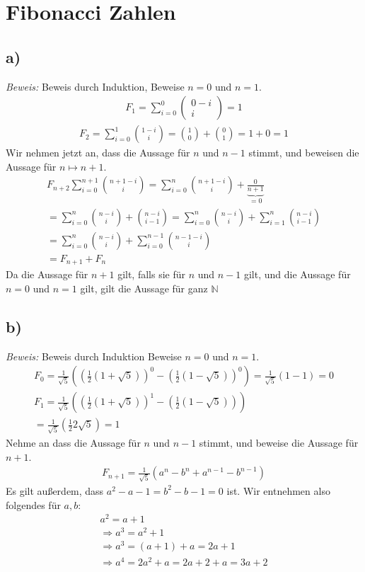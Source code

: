 \documentclass[]{scrartcl}
\begin{document}
\section{Fibonacci Zahlen}
\subsection{a)}
\textit{Beweis: } Beweis durch Induktion, Beweise $n = 0$ und $n=1$.
\begin{gather}
	F_1 = \sum_{i=0}^ 0
	\begin{pmatrix}
		0 - i \\ i
	\end{pmatrix} = 1
\end{gather}
\begin{gather}
	F_2 = \sum_{i=0}^1 {1-i\choose i} = {1\choose 0} + {0 \choose 1} = 1 + 0 = 1
\end{gather}
Wir nehmen jetzt an, dass die Aussage für $n$ und $n-1$ stimmt, und beweisen die Aussage für $n\mapsto n+1$.
\begin{gather}
	F_{n+2}\sum_{i=0}^{n+1} {n+1-i\choose i} = \sum_{i = 0}^n {n+1-i \choose i} + \underbrace{\frac{0}{n+1}}_{=0}\\
	= \sum_{i=0}^n {n-i\choose i}+{n-i \choose i-1} = \sum_{i=0}^n {n-i \choose i} + \sum_{i=1}^{n} {n-i \choose i-1}\\
	= \sum_{i=0}^n {n-i \choose i} + \sum_{i=0}^{n-1} {n-1-i\choose i}\\
	= F_{n+1} + F_n
\end{gather}
Da die Aussage für $n+1$ gilt, falls sie für $n$ und $n-1$ gilt, und die Aussage für $n=0$ und $n=1$ gilt, gilt die Aussage für ganz $\mathbb{N}$

\subsection{b)}
\textit{Beweis: } Beweis durch Induktion Beweise $n=0$ und $n=1$.
\begin{gather}
	F_0 = \frac{1}{\sqrt 5}\left(\left(\frac{1}{2}(1+\sqrt 5)\right)^0 - \left(\frac{1}{2}(1-\sqrt5)\right)^0\right) = \frac{1}{\sqrt5}(1-1) = 0\\
	F_1 = \frac{1}{\sqrt5}\left(\left(\frac{1}{2}(1+\sqrt5)\right)^1 - \left(\frac{1}{2}(1-\sqrt5)\right)\right)\\
	= \frac{1}{\sqrt5}\left(\frac{1}{2}2\sqrt5\right) = 1
\end{gather}
Nehme an dass die Aussage für $n$ und $n-1$ stimmt, und beweise die Aussage für $n+1$.
\begin{gather}
	F_{n+1} = \frac{1}{\sqrt5}\left(a^n - b^n + a^{n-1} - b^{n-1}\right)
\end{gather}
Es gilt außerdem, dass $a^2 - a - 1 = b^2 - b - 1 = 0$ ist. Wir entnehmen also folgendes für $a,b$:
\begin{gather}
	a^2 = a + 1\\
	\Rightarrow a^3 = a^2 + 1\\
	\Rightarrow a^3 = (a + 1) + a = 2a + 1\\
	\Rightarrow a^4 = 2a^2 + a = 2a + 2 + a = 3a + 2
\end{gather}
\end{document}
